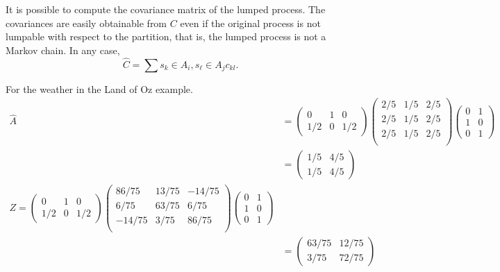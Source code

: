 \documentclass[12pt]{article}
\begin{document}
\begin{example}
It is possible to compute the covariance matrix of the lumped process.
The covariances are easily obtainable from \( C \) even if the
original process is not lumpable with respect to the partition, that
is, the lumped process is not a Markov chain.  In any case,
\[
  \hat{C} = \sum{s_k \in A_i, s_{\ell} \in A_j } c_{kl}.
\]

\begin{example}
  For the weather in the Land of Oz example.
  \begin{align*}
   \hat{A} &=
    \begin{pmatrix}
      0 & 1 & 0 \\
      1/2 & 0 & 1/2
    \end{pmatrix}
    \begin{pmatrix}
      2/5 & 1/5 & 2/5 \\
      2/5 & 1/5 & 2/5 \\
      2/5 & 1/5 & 2/5 \\
    \end{pmatrix}
    \begin{pmatrix}
      0 & 1 \\
      1 & 0 \\
      0 & 1
    \end{pmatrix} \\
    & =
    \begin{pmatrix}
      1/5 & 4/5 \\
      1/5 & 4/5
    \end{pmatrix} \\
   Z =      \begin{pmatrix}
      0 & 1 & 0 \\
      1/2 & 0 & 1/2
    \end{pmatrix}
    \begin{pmatrix}
      86/75 & 13/75 & -14/75 \\
       6/75 & 63/75 &   6/75 \\
     -14/75  & 3/75 &  86/75 \\
    \end{pmatrix}
    \begin{pmatrix}
      0 & 1 \\
      1 & 0 \\
      0 & 1
    \end{pmatrix} \\
    & =
    \begin{pmatrix}
      63/75 & 12/75 \\
       3/75 & 72/75
    \end{pmatrix} \\

\end{align*}
\end{example}
\end{example}
\end{document}
